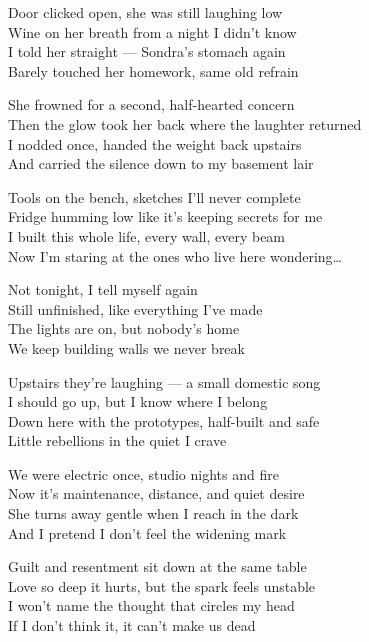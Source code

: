 \begin{lyrics}


Door clicked open, she was still laughing low\\
Wine on her breath from a night I didn’t know\\
I told her straight — Sondra’s stomach again\\
Barely touched her homework, same old refrain

She frowned for a second, half-hearted concern\\
Then the glow took her back where the laughter returned\\
I nodded once, handed the weight back upstairs\\
And carried the silence down to my basement lair

Tools on the bench, sketches I’ll never complete\\
Fridge humming low like it’s keeping secrets for me\\
I built this whole life, every wall, every beam\\
Now I’m staring at the ones who live here wondering…

Not tonight, I tell myself again\\
Still unfinished, like everything I’ve made\\
The lights are on, but nobody’s home\\
We keep building walls we never break

Upstairs they’re laughing — a small domestic song\\
I should go up, but I know where I belong\\
Down here with the prototypes, half-built and safe\\
Little rebellions in the quiet I crave

We were electric once, studio nights and fire\\
Now it’s maintenance, distance, and quiet desire\\
She turns away gentle when I reach in the dark\\
And I pretend I don’t feel the widening mark

Guilt and resentment sit down at the same table\\
Love so deep it hurts, but the spark feels unstable\\
I won’t name the thought that circles my head\\
If I don’t think it, it can’t make us dead


\end{lyrics}
